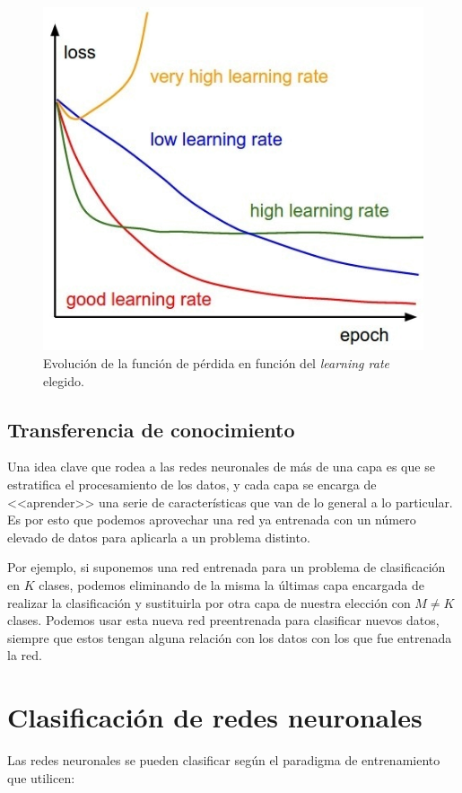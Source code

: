 \documentclass[
  a4paper,
  12pt,
  spanish,
]{scrartcl}
\theoremstyle{teorema-style}
\begin{document}
\begin{figure}[h]
  \centering
  \includegraphics[width=.65\textwidth]{img/learning-rate}
  \caption{Evolución de la función de pérdida en función del \textit{learning rate} elegido.}
  \label{fig:learning-rate}
\end{figure}

\subsection{Transferencia de conocimiento}

Una idea clave que rodea a las redes neuronales de más de una capa es que se estratifica el procesamiento de los datos, y cada capa se encarga de <<aprender>> una serie de características que van de lo general a lo particular. Es por esto que podemos aprovechar una red ya entrenada con un número elevado de datos para aplicarla a un problema distinto.

Por ejemplo, si suponemos una red entrenada para un problema de clasificación en $K$ clases, podemos eliminando de la misma la últimas capa encargada de realizar la clasificación y sustituirla por otra capa de nuestra elección con $M \neq K$ clases. Podemos usar esta nueva red preentrenada para clasificar nuevos datos, siempre que estos tengan alguna relación con los datos con los que fue entrenada la red.

\section{Clasificación de redes neuronales}
\label{sec:clasificacion}

Las redes neuronales se pueden clasificar según el paradigma de entrenamiento que utilicen:
\end{document}
